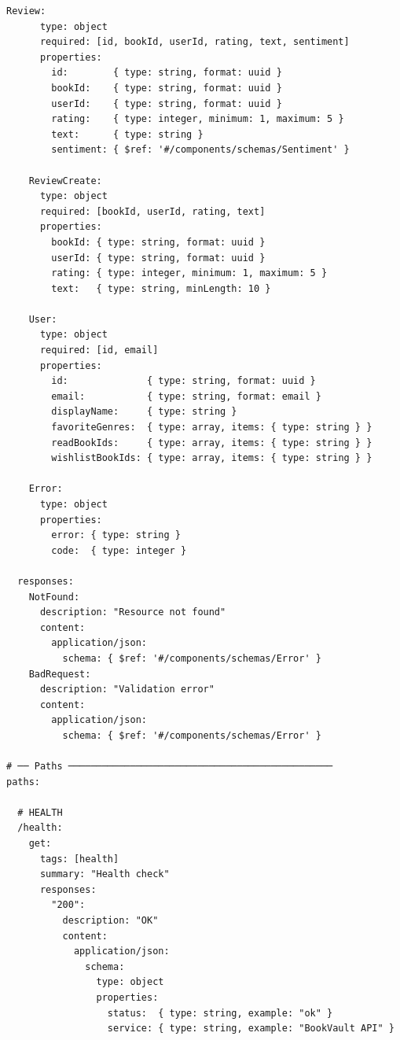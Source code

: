 \documentclass[12pt, a4paper]{report}
\begin{document}
\begin{lstlisting}[style=yaml, caption={openapi.yaml – BookVault REST API}]
    Review:
      type: object
      required: [id, bookId, userId, rating, text, sentiment]
      properties:
        id:        { type: string, format: uuid }
        bookId:    { type: string, format: uuid }
        userId:    { type: string, format: uuid }
        rating:    { type: integer, minimum: 1, maximum: 5 }
        text:      { type: string }
        sentiment: { $ref: '#/components/schemas/Sentiment' }

    ReviewCreate:
      type: object
      required: [bookId, userId, rating, text]
      properties:
        bookId: { type: string, format: uuid }
        userId: { type: string, format: uuid }
        rating: { type: integer, minimum: 1, maximum: 5 }
        text:   { type: string, minLength: 10 }

    User:
      type: object
      required: [id, email]
      properties:
        id:              { type: string, format: uuid }
        email:           { type: string, format: email }
        displayName:     { type: string }
        favoriteGenres:  { type: array, items: { type: string } }
        readBookIds:     { type: array, items: { type: string } }
        wishlistBookIds: { type: array, items: { type: string } }

    Error:
      type: object
      properties:
        error: { type: string }
        code:  { type: integer }

  responses:
    NotFound:
      description: "Resource not found"
      content:
        application/json:
          schema: { $ref: '#/components/schemas/Error' }
    BadRequest:
      description: "Validation error"
      content:
        application/json:
          schema: { $ref: '#/components/schemas/Error' }

# ── Paths ───────────────────────────────────────────────
paths:

  # HEALTH
  /health:
    get:
      tags: [health]
      summary: "Health check"
      responses:
        "200":
          description: "OK"
          content:
            application/json:
              schema:
                type: object
                properties:
                  status:  { type: string, example: "ok" }
                  service: { type: string, example: "BookVault API" }


\end{lstlisting}
\end{document}
